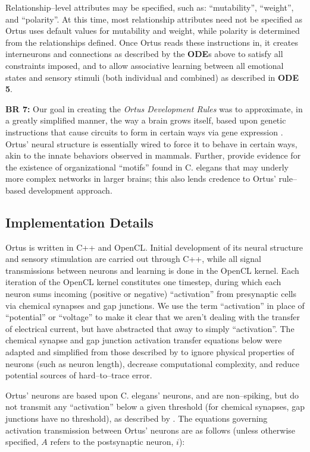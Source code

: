 \documentclass[letterpaper]{article}
\begin{document}
Relationship--level attributes may be specified, such as: ``mutability'', ``weight'', and ``polarity''. At this time, most relationship attributes need not be specified as Ortus uses default values for mutability and weight, while polarity is determined from the relationships defined. Once Ortus reads these instructions in, it creates interneurons and connections as described by the \textbf{ODE}s above to satisfy all constraints imposed, and to allow associative learning between all emotional states and sensory stimuli (both individual and combined) as described in \textbf{ODE 5}.


\textbf{BR 7:} Our goal in creating the \textit{Ortus Development Rules} was to approximate, in a greatly simplified manner, the way a brain grows itself, based upon genetic instructions that cause circuits to form in certain ways via gene expression \citep{Weiner2015}. Ortus' neural structure is essentially wired to force it to behave in certain ways, akin to the innate behaviors observed in mammals. Further, \citet{Schroter2017} provide evidence for the existence of organizational ``motifs'' found in C. elegans that may underly more complex networks in larger brains; this also lends credence to Ortus' rule--based development approach.


\subsection{Implementation Details} Ortus is written in C++ and OpenCL. Initial development of its neural structure and sensory stimulation are carried out through C++, while all signal transmissions between neurons and learning is done in the OpenCL kernel. Each iteration of the OpenCL kernel constitutes one timestep, during which each neuron sums incoming (positive or negative) ``activation'' from presynaptic cells via chemical synapses and gap junctions. We use the term ``activation'' in place of ``potential'' or ``voltage'' to make it clear that we aren't dealing with the transfer of electrical current, but have abstracted that away to simply ``activation''. The chemical synapse and gap junction activation transfer equations below were adapted and simplified from those described by \cite{Wicks1996} to ignore physical properties of neurons (such as neuron length), decrease computational complexity, and reduce potential sources of hard--to--trace error.

Ortus' neurons are based upon C. elegans' neurons, and are non--spiking, but do not transmit any ``activation'' below a given threshold (for chemical synapses, gap junctions have no threshold), as described by \citet{Graubard1014}. The equations governing activation transmission between Ortus' neurons are as follows (unless otherwise specified, $A$ refers to the postsynaptic neuron, $i$):
\end{document}
